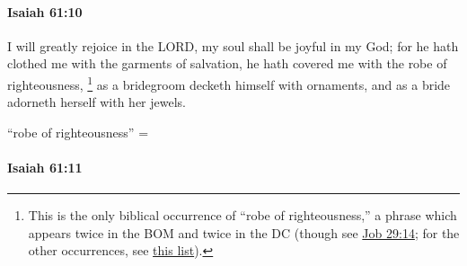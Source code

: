 		\paragraph{Isaiah 61:10} %
			\label{ISAIAH-61-10}

			I will greatly rejoice in the LORD, my soul shall be joyful in my God; for he hath clothed me with the garments of salvation, he hath covered me with the robe of righteousness,%
				\footnote{%
					This is the only biblical occurrence of ``robe of righteousness,'' a phrase which appears twice in the BOM and twice in the DC (though see \hyperref[JOB-29-14]{Job 29:14}; for the other occurrences, see \hyperref[RIGHTEOUSNESS-PHRASES]{this list}).
					}
			as a bridegroom decketh himself with ornaments, and as a bride adorneth herself with her jewels.

			\begin{framed}
			\scriptsize
				\begin{compactdesc}
					\item[BHS] ``robe of righteousness'' = 
				\end{compactdesc}
			\end{framed}

		\paragraph{Isaiah 61:11} %
			\label{ISAIAH-61-11}


